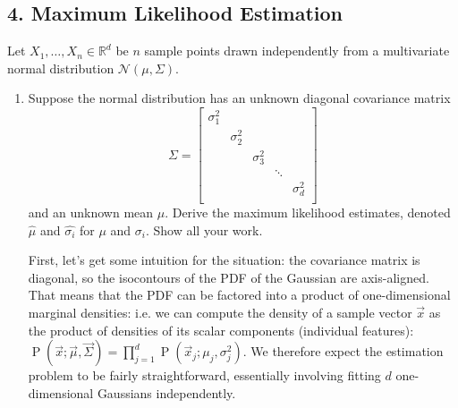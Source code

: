\documentclass{article}
\renewcommand{\N}{\mathcal{N}}
\renewcommand{\R}{\mathbb{R}}
\DeclareMathOperator{\p}{\text{P}}
\renewcommand{\hat}{\widehat}
\begin{document}
\subsection*{4. Maximum Likelihood Estimation}
Let $X_1, \ldots, X_n \in \R^d$ be $n$ sample points drawn independently from a multivariate normal distribution $\N(\mu, \Sigma)$.
\begin{enumerate}[label=(\alph*)]
    \item Suppose the normal distribution has an unknown diagonal covariance matrix
    $$
    \Sigma =
    \begin{bmatrix}
    \sigma_1^2 & & & & \\
    & \sigma_2^2 & & & \\
    & & \sigma_3^2 & & \\
    & & & \ddots & \\
    & & & & \sigma_d^2 \\
    \end{bmatrix}
    $$
    and an unknown mean $\mu$. Derive the maximum likelihood estimates, denoted $\hat{\mu}$ and $\hat{\sigma_i}$ for $\mu$ and $\sigma_i$. Show all your work.
    \begin{mdframed}
      First, let's get some intuition for the situation: the covariance matrix
      is diagonal, so the isocontours of the PDF of the Gaussian are
      axis-aligned. That means that the PDF can be factored into a product of
      one-dimensional marginal densities: i.e. we can compute the density of a
      sample vector $\vec x$ as the product of densities of its scalar
      components (individual features):
      $\p(\vec x;\vec \mu, \vec \Sigma) = \prod_{j=1}^d \p(\vec x_j; \mu_j,
      \sigma^2_j)$. We therefore expect the estimation problem to be fairly
      straightforward, essentially involving fitting $d$ one-dimensional
      Gaussians independently.


\end{mdframed}
\end{enumerate}
\end{document}
